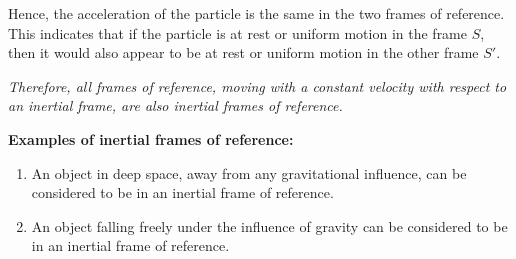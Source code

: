 	Hence, the acceleration of the particle is the same in the two frames of reference. This indicates that if the particle is at rest or uniform motion in the frame $S$, then it would also appear to be at rest or uniform motion in the other frame $S'$.
	
	\emph{Therefore, all frames of reference, moving with a constant velocity with respect to an inertial frame, are also inertial frames of reference.}
	
	\textbf{Examples of inertial frames of reference:}
	\begin{enumerate}
		\item An object in deep space, away from any gravitational influence, can be considered to be in an inertial frame of reference.
		
		\item An object falling freely under the influence of gravity can be considered to be in an inertial frame of reference.
	\end{enumerate}